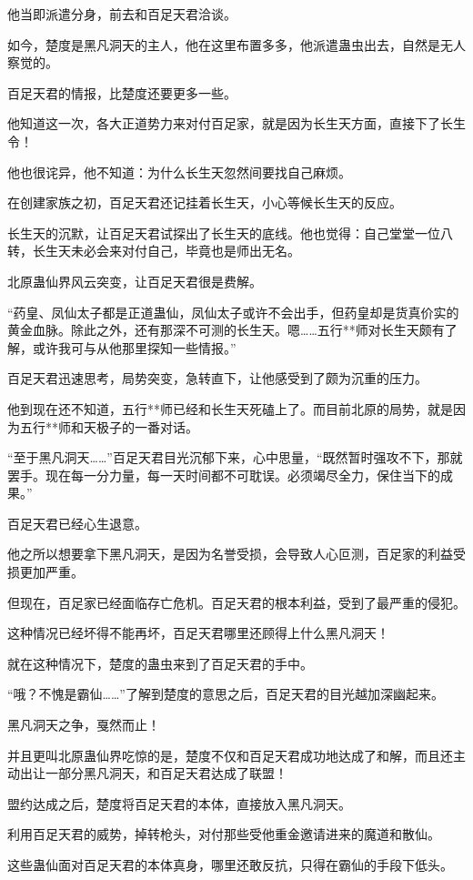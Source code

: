 \begin{this_body}
他当即派遣分身，前去和百足天君洽谈。

如今，楚度是黑凡洞天的主人，他在这里布置多多，他派遣蛊虫出去，自然是无人察觉的。

百足天君的情报，比楚度还要更多一些。

他知道这一次，各大正道势力来对付百足家，就是因为长生天方面，直接下了长生令！

他也很诧异，他不知道：为什么长生天忽然间要找自己麻烦。

在创建家族之初，百足天君还记挂着长生天，小心等候长生天的反应。

长生天的沉默，让百足天君试探出了长生天的底线。他也觉得：自己堂堂一位八转，长生天未必会来对付自己，毕竟也是师出无名。

北原蛊仙界风云突变，让百足天君很是费解。

“药皇、凤仙太子都是正道蛊仙，凤仙太子或许不会出手，但药皇却是货真价实的黄金血脉。除此之外，还有那深不可测的长生天。嗯……五行**师对长生天颇有了解，或许我可与从他那里探知一些情报。”

百足天君迅速思考，局势突变，急转直下，让他感受到了颇为沉重的压力。

他到现在还不知道，五行**师已经和长生天死磕上了。而目前北原的局势，就是因为五行**师和天极子的一番对话。

“至于黑凡洞天……”百足天君目光沉郁下来，心中思量，“既然暂时强攻不下，那就罢手。现在每一分力量，每一天时间都不可耽误。必须竭尽全力，保住当下的成果。”

百足天君已经心生退意。

他之所以想要拿下黑凡洞天，是因为名誉受损，会导致人心叵测，百足家的利益受损更加严重。

但现在，百足家已经面临存亡危机。百足天君的根本利益，受到了最严重的侵犯。

这种情况已经坏得不能再坏，百足天君哪里还顾得上什么黑凡洞天！

就在这种情况下，楚度的蛊虫来到了百足天君的手中。

“哦？不愧是霸仙……”了解到楚度的意思之后，百足天君的目光越加深幽起来。

黑凡洞天之争，戛然而止！

并且更叫北原蛊仙界吃惊的是，楚度不仅和百足天君成功地达成了和解，而且还主动出让一部分黑凡洞天，和百足天君达成了联盟！

盟约达成之后，楚度将百足天君的本体，直接放入黑凡洞天。

利用百足天君的威势，掉转枪头，对付那些受他重金邀请进来的魔道和散仙。

这些蛊仙面对百足天君的本体真身，哪里还敢反抗，只得在霸仙的手段下低头。


\end{this_body}
